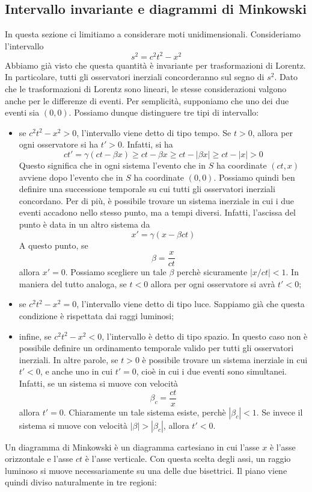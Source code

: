 \documentclass[a4paper,11pt]{book}
\theoremstyle{theorem}
\theoremstyle{definition}
\begin{document}
\subsection{Intervallo invariante e diagrammi di Minkowski}
In questa sezione ci limitiamo a considerare moti unidimensionali. Consideriamo l'intervallo
\[s^2=c^2t^2-x^2\]
Abbiamo già visto che questa quantità è invariante per trasformazioni di Lorentz. In particolare, tutti gli osservatori inerziali concorderanno sul segno di $s^2$. Dato che le trasformazioni di Lorentz sono lineari, le stesse considerazioni valgono anche per le differenze di eventi. Per semplicità, supponiamo che uno dei due eventi sia $(0,0)$. Possiamo dunque distinguere tre tipi di intervallo:
\begin{itemize}
	\item se $c^2t^2-x^2>0$, l'intervallo viene detto di tipo tempo. Se $t>0$, allora per ogni osservatore si ha $t'>0$. Infatti, si ha
	\[ct'=\gamma(ct-\beta x)\geq ct-\beta x\geq ct-|\beta x|\geq ct-|x|>0\] 
	Questo significa che in ogni sistema l'evento che in $S$ ha coordinate $(ct,x)$ avviene dopo l'evento che in $S$ ha coordinate $(0,0)$. Possiamo quindi ben definire una successione temporale su cui tutti gli osservatori inerziali concordano. Per di più, è possibile trovare un sistema inerziale in cui i due eventi accadono nello stesso punto, ma a tempi diversi. Infatti, l'ascissa del punto è data in un altro sistema da
	\[x'=\gamma(x-\beta ct)\]
	A questo punto, se
	\[\beta=\frac{x}{ct}\]
	allora $x'=0$. Possiamo scegliere un tale $\beta$ perchè sicuramente $|x/ct|<1$. In maniera del tutto analoga, se $t<0$ allora per ogni osservatore si avrà $t'<0$;
	\item se $c^2t^2-x^2=0$, l'intervallo viene detto di tipo luce. Sappiamo già che questa condizione è rispettata dai raggi luminosi;
	\item infine, se $c^2t^2-x^2<0$, l'intervallo è detto di tipo spazio. In questo caso non è possibile definire un ordinamento temporale valido per tutti gli osservatori inerziali. In altre parole, se $t>0$ è possibile trovare un sistema inerziale in cui $t'<0$, e anche uno in cui $t'=0$, cioè in cui i due eventi sono simultanei. Infatti, se un sistema si muove con velocità
	\[\beta_c=\frac{ct}{x}\]
	allora $t'=0$. Chiaramente un tale sistema esiste, perchè $|\beta_c|<1$. Se invece il sistema si muove con velocità $|\beta|>|\beta_c|$, allora $t'<0$.
\end{itemize}
\noindent Un diagramma di Minkowski è un diagramma cartesiano in cui l'asse $x$ è l'asse orizzontale e l'asse $ct$ è l'asse verticale. Con questa scelta degli assi, un raggio luminoso si muove necessariamente su una delle due bisettrici. Il piano viene quindi diviso naturalmente in tre regioni:
\end{document}
